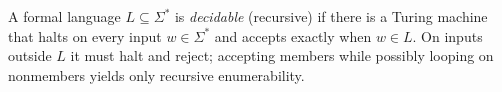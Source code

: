 
A formal language $L\subseteq\Sigma^*$ is \emph{decidable} (recursive) if there is a Turing machine that halts on every input $w\in\Sigma^*$ and accepts exactly when $w\in L$. On inputs outside $L$ it must halt and reject; accepting members while possibly looping on nonmembers yields only recursive enumerability.
